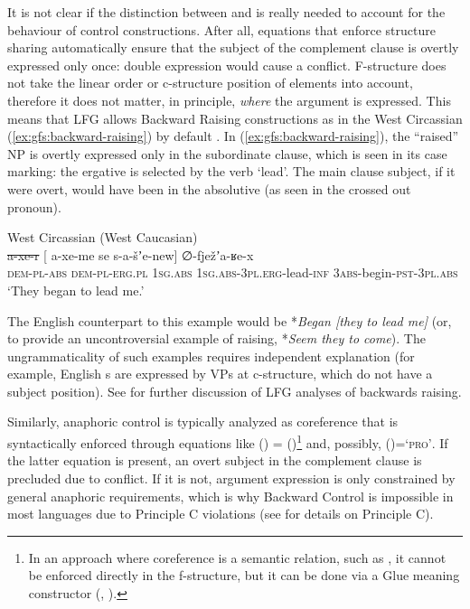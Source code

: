 \documentclass[output=paper]{../langscibook}
\begin{document}
 It is not clear if the distinction between \COMP and \XCOMP is really needed to account for the behaviour of control constructions. After all, equations that enforce structure sharing automatically ensure that the subject of the complement clause is overtly expressed only once: double expression would cause a \PRED conflict. F-structure does not take the linear order or c-structure position of elements into account, therefore it does not matter, in principle, \textit{where} the argument is expressed. This means that LFG allows Backward Raising constructions as in the West Circassian (\ref{ex:gfs:backward-raising}) by default \citep{sellssubsump}. In (\ref{ex:gfs:backward-raising}), the ``raised'' NP is overtly expressed only in the subordinate clause, which is seen in its case marking: the ergative is selected by the verb `lead'. The main clause subject, if it were overt, would have been in the absolutive (as seen in the crossed out pronoun).
 
 \ea\label{ex:gfs:backward-raising}
    West Circassian (West Caucasian)\\
    \gll \st{a-xe-r} [ a-xe-me se s-a-šʼe-new] ∅-fježʼa-ʁe-x\\
    \textsc{dem-pl-abs} {} \textsc{dem-pl-erg.pl} \textsc{1sg.abs} \textsc{1sg.abs-3pl.erg}-lead-\textsc{inf} \textsc{3abs}-begin-\textsc{pst-3pl.abs}\\
    \glt `They began to lead me.' \citep[76]{PotsdamPolinsky2012}
 \z
 
 \noindent The English counterpart to this example would be *\textit{Began \textup{[}they to lead me\textup{]}} (or, to provide an uncontroversial example of raising, *\textit{Seem they to come}). The ungrammaticality of such examples requires independent explanation (for example, English {\XCOMP}s are expressed by VPs at c-structure, which do not have a subject position). See  for further discussion of LFG analyses of backwards raising.
 
 Similarly, anaphoric control is typically analyzed as coreference that is syntactically enforced through equations like (\UP\SUBJ\NINDEX) = \mbox{(\UP\COMP\SUBJ\NINDEX)}\footnote{In an approach where coreference is a semantic relation, such as \citet{Haug2013}, it cannot be enforced directly in the f-structure, but it can be done via a Glue meaning constructor (\citealt{Haug2014}, ).} and, possibly, (\UP\COMP\SUBJ\PRED)=\textsc{`pro'}. If the latter equation is present, an overt subject in the complement clause is precluded due to \PRED conflict. If it is not, argument expression is only constrained by general anaphoric requirements, which is why Backward Control \citep{polipots02} is impossible in most languages due to Principle C violations (see  for details on Principle C).
 
\end{document}
